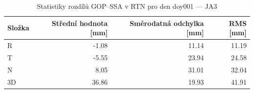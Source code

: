 \begin{table}[H]
\centering
\caption{Statistiky rozdílů GOP–SSA v RTN pro den doy001 — JA3}
\label{tab:gop_vs_ssa_ja3_doy001_day_stats}
\begin{tabular}{lrrr}
\toprule
Složka & Střední hodnota [mm] & Směrodatná odchylka [mm] & RMS [mm] \\
\midrule
R & -1.08 & 11.14 & 11.19 \\
T & -5.55 & 23.94 & 24.58 \\
N & 8.05 & 31.01 & 32.04 \\
3D & 36.86 & 19.93 & 41.91 \\
\bottomrule
\end{tabular}
\end{table}
